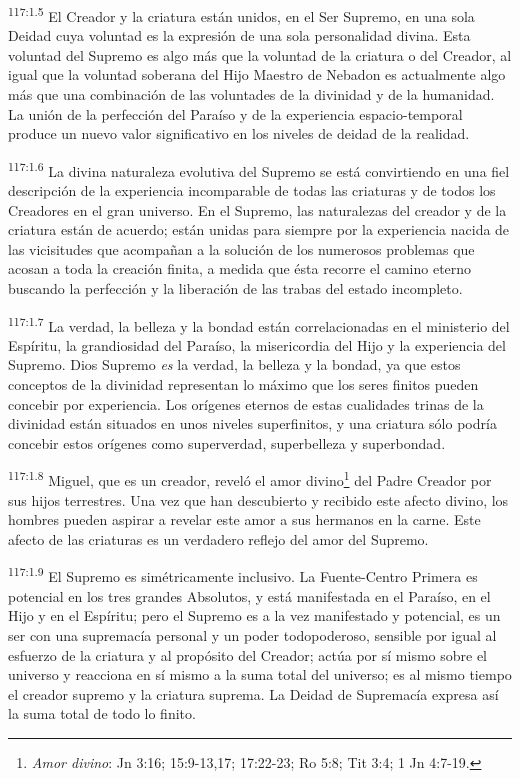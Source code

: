 \par
\textsuperscript{117:1.5} El Creador y la criatura están unidos, en el Ser Supremo, en una sola Deidad cuya voluntad es la expresión de una sola personalidad divina. Esta voluntad del Supremo es algo más que la voluntad de la criatura o del Creador, al igual que la voluntad soberana del Hijo Maestro de Nebadon es actualmente algo más que una combinación de las voluntades de la divinidad y de la humanidad. La unión de la perfección del Paraíso y de la experiencia espacio-temporal produce un nuevo valor significativo en los niveles de deidad de la realidad.

\par
\textsuperscript{117:1.6} La divina naturaleza evolutiva del Supremo se está convirtiendo en una fiel descripción de la experiencia incomparable de todas las criaturas y de todos los Creadores en el gran universo. En el Supremo, las naturalezas del creador y de la criatura están de acuerdo; están unidas para siempre por la experiencia nacida de las vicisitudes que acompañan a la solución de los numerosos problemas que acosan a toda la creación finita, a medida que ésta recorre el camino eterno buscando la perfección y la liberación de las trabas del estado incompleto.

\par
\textsuperscript{117:1.7} La verdad, la belleza y la bondad están correlacionadas en el ministerio del Espíritu, la grandiosidad del Paraíso, la misericordia del Hijo y la experiencia del Supremo. Dios Supremo \textit{es} la verdad, la belleza y la bondad, ya que estos conceptos de la divinidad representan lo máximo que los seres finitos pueden concebir por experiencia. Los orígenes eternos de estas cualidades trinas de la divinidad están situados en unos niveles superfinitos, y una criatura sólo podría concebir estos orígenes como superverdad, superbelleza y superbondad.

\par
\textsuperscript{117:1.8} Miguel, que es un creador, reveló el amor divino\footnote{\textit{Amor divino}: Jn 3:16; 15:9-13,17; 17:22-23; Ro 5:8; Tit 3:4; 1 Jn 4:7-19.} del Padre Creador por sus hijos terrestres. Una vez que han descubierto y recibido este afecto divino, los hombres pueden aspirar a revelar este amor a sus hermanos en la carne. Este afecto de las criaturas es un verdadero reflejo del amor del Supremo.

\par
\textsuperscript{117:1.9} El Supremo es simétricamente inclusivo. La Fuente-Centro Primera es potencial en los tres grandes Absolutos, y está manifestada en el Paraíso, en el Hijo y en el Espíritu; pero el Supremo es a la vez manifestado y potencial, es un ser con una supremacía personal y un poder todopoderoso, sensible por igual al esfuerzo de la criatura y al propósito del Creador; actúa por sí mismo sobre el universo y reacciona en sí mismo a la suma total del universo; es al mismo tiempo el creador supremo y la criatura suprema. La Deidad de Supremacía expresa así la suma total de todo lo finito.

